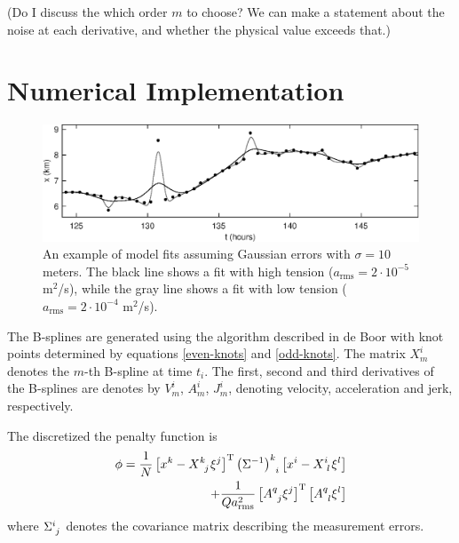 \documentclass[twocol]{ametsoc}
\begin{document}
(Do I discuss the which order $m$ to choose? We can make a statement about the noise at each derivative, and whether the physical value exceeds that.)

%
\section{Numerical Implementation}
%

\begin{figure}[t]
  \centerline{\includegraphics[width=39pc,angle=0]{gaussianfit}}
  
  \caption{An example of model fits assuming Gaussian errors with $\sigma=10$ meters. The black line shows a fit with high tension ($a_{\textrm{rms}}=2 \cdot 10^{-5}$ m$^2$/s), while the gray line shows a fit with  low tension ($a_{\textrm{rms}}=2 \cdot 10^{-4}$ m$^2$/s).}
  \label{gaussianfit}
\end{figure}


The B-splines are generated using the algorithm described in de Boor with knot points determined by equations \ref{even-knots} and \ref{odd-knots}. The matrix $X^i_m$ denotes the $m$-th B-spline at time $t_i$. The first, second and third derivatives of the B-splines are denotes by $V^i_m$, $A^i_m$, $J^i_m$, denoting velocity, acceleration and jerk, respectively.

The discretized the penalty function is
\begin{equation}
\begin{split}
\phi = \frac{1}{N} \left[ x^k - X\indices{^k_j} \xi^j \right]^{\textrm{T}} \left(\Sigma^{-1}\right)\indices{^k_i} \left[ x^i - X\indices{^i_l} \xi^l \right] \\
+ \frac{1}{Q a_{\textrm{rms}}^2} \left[A\indices{^q_j} \xi^j \right]^{\textrm{T}} \left[ A\indices{^q_l} \xi^l \right]
\end{split}
\end{equation}
where $\Sigma\indices{^i_j}$ denotes the covariance matrix describing the measurement errors.
\end{document}
